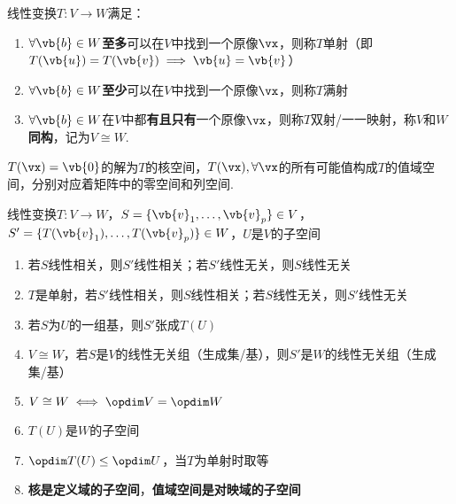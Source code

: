 \begin{definition}[单射与满射]
线性变换$T:V\to W$满足：
\begin{enumerate}
	\item $\forall\vb{b}\in W$\textbf{至多}可以在$V$中找到一个原像$\vx$，则称$T$单射（即$T(\vb{u})=T(\vb{v})\implies \vb{u}=\vb{v}$）
	\item $\forall\vb{b}\in W$\textbf{至少}可以在$V$中找到一个原像$\vx$，则称$T$满射
	\item $\forall\vb{b}\in W$在$V$中都\textbf{有且只有}一个原像$\vx$，则称$T$双射/一一映射，称$V$和$W$\textbf{同构}，记为$V\cong W$.
\end{enumerate}
\end{definition}
\begin{definition}[核空间与值域空间]
$T(\vx)=\vb{0}$的解为$T$的核空间，$T(\vx),\forall\vx$的所有可能值构成$T$的值域空间，分别对应着矩阵中的零空间和列空间.
\end{definition}
\begin{theorem}%
\label{lt_theo}
线性变换$T:V\to W$，$S=\{\vb{v}_1,\dots,\vb{v}_p\}\in V$，$S'=\{T(\vb{v}_1),\dots,T(\vb{v}_p)\}\in W$，$U$是$V$的子空间
\begin{enumerate}
	\item \label{l1}若$S$线性相关，则$S'$线性相关；若$S'$线性无关，则$S$线性无关
	\item \label{l2}$T$是单射，若$S'$线性相关，则$S$线性相关；若$S$线性无关，则$S'$线性无关
	\item \label{l3}若$S$为$U$的一组基，则$S'$张成$T(U)$
	\item \label{l4}$V\cong W$，若$S$是$V$的线性无关组（生成集/基），则$S'$是$W$的线性无关组（生成集/基）
	\item $V\cong W\iff\opdim V=\opdim W$
	\item \label{subspace_range}$T(U)$是$W$的子空间
	\item $\opdim T(U)\leq\opdim U$，当$T$为单射时取等
	\item \textbf{核是定义域的子空间}，\textbf{值域空间是对映域的子空间}
\end{enumerate}
\end{theorem}
